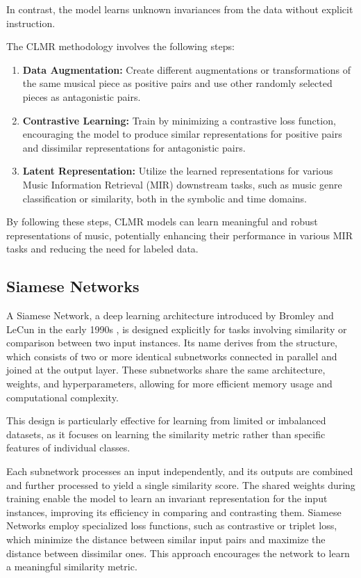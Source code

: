 In contrast, the model learns unknown invariances from the data without explicit instruction.

The CLMR methodology involves the following steps:

\begin{enumerate}
\item \textbf{Data Augmentation:} Create different augmentations or transformations of the same musical piece as positive pairs and use other randomly selected pieces as antagonistic pairs.
\item \textbf{Contrastive Learning:} Train by minimizing a contrastive loss function, encouraging the model to produce similar representations for positive pairs and dissimilar representations for antagonistic pairs.
\item\textbf{Latent Representation:} Utilize the learned representations for various Music Information Retrieval (MIR) downstream tasks, such as music genre classification or similarity, both in the symbolic and time domains.
\end{enumerate}

By following these steps, CLMR models can learn meaningful and robust representations of music, potentially enhancing their performance in various MIR tasks and reducing the need for labeled data.

\subsection{Siamese Networks}

A Siamese Network, a deep learning architecture introduced by Bromley and LeCun in the early 1990s \cite{Bromley1993SignatureNetwork}, is designed explicitly for tasks involving similarity or comparison between two input instances. Its name derives from the structure, which consists of two or more identical subnetworks connected in parallel and joined at the output layer. These subnetworks share the same architecture, weights, and hyperparameters, allowing for more efficient memory usage and computational complexity. 

This design is particularly effective for learning from limited or imbalanced datasets, as it focuses on learning the similarity metric rather than specific features of individual classes.

Each subnetwork processes an input independently, and its outputs are combined and further processed to yield a single similarity score. The shared weights during training enable the model to learn an invariant representation for the input instances, improving its efficiency in comparing and contrasting them. Siamese Networks employ specialized loss functions, such as contrastive or triplet loss, which minimize the distance between similar input pairs and maximize the distance between dissimilar ones. This approach encourages the network to learn a meaningful similarity metric.



